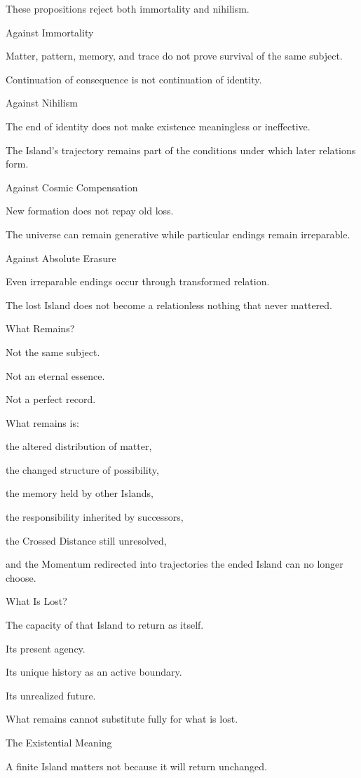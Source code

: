 These propositions reject both immortality and nihilism.

Against Immortality

Matter, pattern, memory, and trace do not prove survival of the same subject.

Continuation of consequence is not continuation of identity.

Against Nihilism

The end of identity does not make existence meaningless or ineffective.

The Island’s trajectory remains part of the conditions under which later relations form.

Against Cosmic Compensation

New formation does not repay old loss.

The universe can remain generative while particular endings remain irreparable.

Against Absolute Erasure

Even irreparable endings occur through transformed relation.

The lost Island does not become a relationless nothing that never mattered.

What Remains?

Not the same subject.

Not an eternal essence.

Not a perfect record.

What remains is:

the altered distribution of matter,

the changed structure of possibility,

the memory held by other Islands,

the responsibility inherited by successors,

the Crossed Distance still unresolved,

and the Momentum redirected into trajectories the ended Island can no longer choose.

What Is Lost?

The capacity of that Island to return as itself.

Its present agency.

Its unique history as an active boundary.

Its unrealized future.

What remains cannot substitute fully for what is lost.

The Existential Meaning

A finite Island matters not because it will return unchanged.

